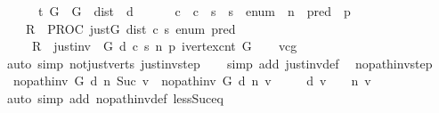 \begin{isabellebody}
\ \ \ \ {\isasymGamma}\ \ {\isasymturnstile}\isactrlsub t\ {\isasymlbrace}{\isasymacute}G\ {\isacharequal}\ G\ {\isasymand}\ {\isasymacute}dist\ {\isacharequal}\ d\ {\isasymand}\ \isanewline
\ \ \ \ {\isasymacute}c\ {\isacharequal}\ c\ {\isasymand}\ {\isasymacute}s\ {\isacharequal}\ s\ {\isasymand}\ {\isasymacute}enum\ {\isacharequal}\ n\ {\isasymand}\ {\isasymacute}pred\ {\isacharequal}\ p{\isasymrbrace}\isanewline
\ \ \ \ {\isasymacute}R\ {\isacharcolon}{\isacharequal}{\isacharequal}\ PROC\ just{\isacharparenleft}{\isasymacute}G{\isacharcomma}\ {\isasymacute}dist{\isacharcomma}\ {\isasymacute}c{\isacharcomma}\ {\isasymacute}s{\isacharcomma}\ {\isasymacute}enum{\isacharcomma}\ {\isasymacute}pred{\isacharparenright}\isanewline
\ \ \ \ {\isasymlbrace}\ {\isasymacute}R\ {\isacharequal}\ just{\isacharunderscore}inv\ \ G\ d\ c\ s\ n\ p\ {\isacharparenleft}ivertex{\isacharunderscore}cnt\ G{\isacharparenright}{\isasymrbrace}{\isachardoublequoteclose}\isanewline
%
\isadelimproof
\ \ %
\endisadelimproof
%
\isatagproof
{}\isamarkupfalse%
\ vcg\ \isanewline
\ \ \isamarkupfalse%
\ {\isacharparenleft}auto\ simp{\isacharcolon}\ not{\isacharunderscore}just{\isacharunderscore}verts\ just{\isacharunderscore}inv{\isacharunderscore}step{\isacharparenright}\isanewline
\ \ \isamarkupfalse%
\ {\isacharparenleft}simp\ add{\isacharcolon}\ just{\isacharunderscore}inv{\isacharunderscore}def{\isacharparenright}\ \isanewline
{}\isamarkupfalse%
%
\endisatagproof
{\isafoldproof}%
%
\isadelimproof
\isanewline
%
\endisadelimproof
\isanewline
{}\isamarkupfalse%
\ no{\isacharunderscore}path{\isacharunderscore}inv{\isacharunderscore}step{\isacharcolon}\isanewline
\ \ {\isachardoublequoteopen}no{\isacharunderscore}path{\isacharunderscore}inv\ G\ d\ n\ {\isacharparenleft}Suc\ v{\isacharparenright}\ {\isasymlongleftrightarrow}\ no{\isacharunderscore}path{\isacharunderscore}inv\ G\ d\ n\ v\isanewline
\ \ \ \ {\isasymand}\ {\isacharparenleft}d\ v\ {\isacharequal}\ {\isasyminfinity}\ {\isasymlongleftrightarrow}\ n\ v\ {\isacharequal}\ {\isasyminfinity}{\isacharparenright}{\isachardoublequoteclose}\isanewline
%
\isadelimproof
\ \ %
\endisadelimproof
%
\isatagproof
{}\isamarkupfalse%
\ {\isacharparenleft}auto\ simp\ add{\isacharcolon}\ no{\isacharunderscore}path{\isacharunderscore}inv{\isacharunderscore}def\ less{\isacharunderscore}Suc{\isacharunderscore}eq{\isacharparenright}%
\endisatagproof
{\isafoldproof}%
%
\isadelimproof
\isanewline
%
\endisadelimproof
\isanewline
{}\isamarkupfalse%

\end{isabellebody}
